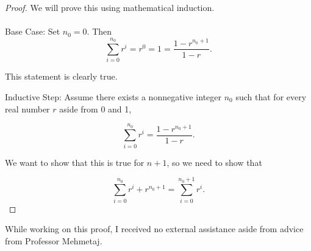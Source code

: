 \documentclass[12pt]{article}
\begin{document}
\begin{proof} We will prove this using mathematical induction. \\ \\

    Base Case: Set $n_0 = 0.$ Then $$\sum_{i=0}^{n_0} r^i = r^0 = 1 = \frac{1 - r^{n_0+1}}{1 - r}.$$

    This statement is clearly true.

    Inductive Step: Assume there exists a nonnegative integer $n_0$ such that for every real number $r$ aside from 0 and 1,

    $$\sum_{i=0}^{n_0} r^i = \frac{1 - r^{n_0+1}}{1 - r}.$$

    We want to show that this is true for $n+1$, so we need to show that

    $$\sum_{i=0}^{n_0} r^i + r^{n_0+1} = \sum_{i=0}^{n_0 + 1} r^i.$$


\end{proof}


\noindent While working on this proof, I received no external assistance aside from advice from Professor Mehmetaj.
\end{document}
